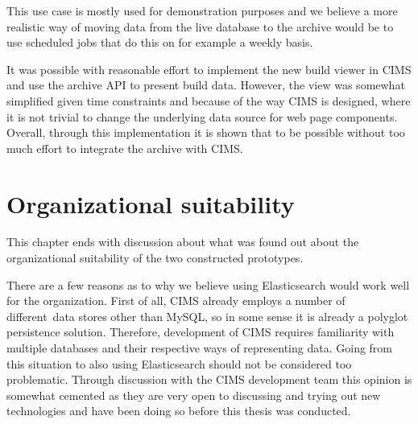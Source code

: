 This use case is mostly used for demonstration purposes and we believe a more realistic way of moving data from the live database to the archive would be to use scheduled jobs that do this on for example a weekly basis.

It was possible with reasonable effort to implement the new build viewer in CIMS and use the archive API to present build data. However, the view was somewhat simplified given time constraints and because of the way CIMS is designed, where it is not trivial to change the underlying data source for web page components. Overall, through this implementation it is shown that to be possible without too much effort to integrate the archive with CIMS.



\section{Organizational suitability}
This chapter ends with discussion about what was found out about the organizational suitability of the two constructed prototypes.


There are a few reasons as to why we believe using Elasticsearch would work well for the organization. First of all, CIMS already employs a number of different\footnotemark\ data stores other than MySQL, so in some sense it is already a polyglot persistence solution. Therefore, development of CIMS requires familiarity with multiple databases and their respective ways of representing data. Going from this situation to also using Elasticsearch should not be considered too problematic. Through discussion with the CIMS development team this opinion is somewhat cemented as they are very open to discussing and trying out new technologies and have been doing so before this thesis was conducted. 



